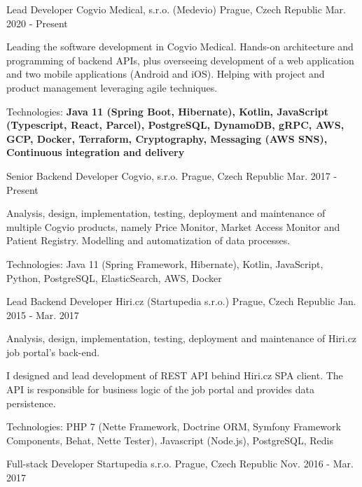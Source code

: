 \begin{cventries}
  \cventry
    {Lead Developer}
    {Cogvio Medical, s.r.o. (Medevio)}
    {Prague, Czech Republic}
    {Mar. 2020 - Present}
    {
    \begin{cvitems}
      \item {Leading the software development in Cogvio Medical. Hands-on architecture and programming of backend APIs, plus overseeing development of a web application and two mobile applications (Android and iOS).
       Helping with project and product management leveraging agile techniques.}
      \item {Technologies: \textbf{Java 11 (Spring Boot, Hibernate), Kotlin, JavaScript (Typescript, React, Parcel), PostgreSQL, DynamoDB, gRPC, AWS, GCP, Docker, Terraform, Cryptography, Messaging (AWS SNS), Continuous integration and delivery}}
    \end{cvitems}
  }
  \cventry
    {Senior Backend Developer}
    {Cogvio, s.r.o.}
    {Prague, Czech Republic}
    {Mar. 2017 - Present}
    {
    \begin{cvitems}
      \item {Analysis, design, implementation, testing, deployment and maintenance of multiple Cogvio products, namely Price Monitor, Market Access Monitor and Patient Registry. Modelling and automatization of data processes.}
      \item {Technologies: Java 11 (Spring Framework, Hibernate), Kotlin, JavaScript, Python, PostgreSQL, ElasticSearch, AWS, Docker}
    \end{cvitems}
  }
  \cventry
    {Lead Backend Developer}
    {Hiri.cz (Startupedia s.r.o.)}
    {Prague, Czech Republic}
    {Jan. 2015 - Mar. 2017}
    {
      \begin{cvitems}
        \item {Analysis, design, implementation, testing, deployment and maintenance of Hiri.cz job portal's back-end.}
        \item {I designed and lead development of REST API behind Hiri.cz SPA client. The API is responsible for business logic of the job portal and provides data persistence.}
        \item {Technologies: PHP 7 (Nette Framework, Doctrine ORM, Symfony Framework Components, Behat, Nette Tester), Javascript (Node.js), PostgreSQL, Redis}
      \end{cvitems}
    }
  \cventry
    {Full-stack Developer}
    {Startupedia s.r.o.}
    {Prague, Czech Republic}
    {Nov. 2016 - Mar. 2017}

\end{cventries}
